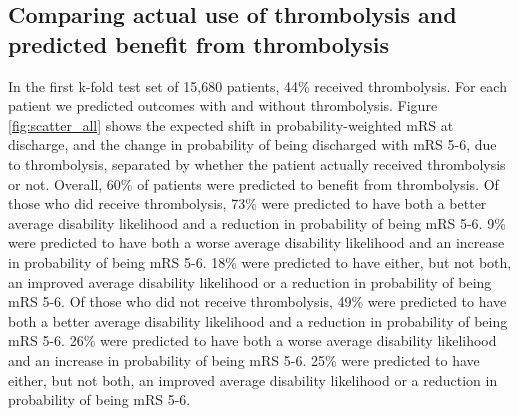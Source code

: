 
\subsection{Comparing actual use of thrombolysis and predicted benefit from thrombolysis}

In the first k-fold test set of 15,680 patients, 44\% received thrombolysis. For each patient we predicted outcomes with and without thrombolysis. Figure \ref{fig:scatter_all} shows the expected shift in probability-weighted mRS at discharge, and the change in probability of being discharged with mRS 5-6, due to thrombolysis, separated by whether the patient actually received thrombolysis or not. Overall, 60\% of patients were predicted to benefit from thrombolysis. Of those who did receive thrombolysis, 73\% were predicted to have both a better average disability likelihood and a reduction in probability of being mRS 5-6. 9\% were predicted to have both a worse average disability likelihood and an increase in probability of being mRS 5-6. 18\% were predicted to have either, but not both, an improved average disability likelihood or a reduction in probability of being mRS 5-6. Of those who did not receive thrombolysis, 49\% were predicted to have both a better average disability likelihood and a reduction in probability of being mRS 5-6. 26\% were predicted to have both a worse average disability likelihood and an increase in probability of being mRS 5-6. 25\% were predicted to have either, but not both, an improved average disability likelihood or a reduction in probability of being mRS 5-6.

